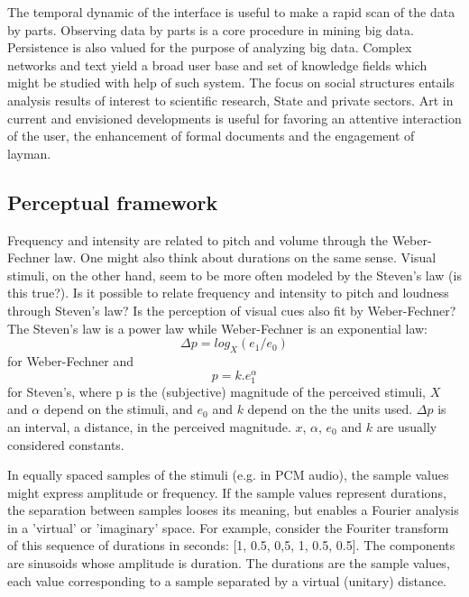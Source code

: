 \documentclass[letterpaper,10pt]{article}
\begin{document}
The temporal dynamic of the interface is useful to make a rapid scan of the data by parts.
Observing data by parts is a core procedure in mining big data.
Persistence is also valued for the purpose of analyzing big data.
Complex networks and text yield a broad user base
and set of knowledge fields which might be studied with help of such system.
The focus on social structures entails analysis results of interest
to scientific research, State and private sectors.
Art in current and envisioned developments
is useful for favoring an attentive interaction of the user,
the enhancement of formal documents and the engagement
of layman.

\subsection{Perceptual framework}\label{perceptual}
Frequency and intensity are related to pitch and volume
through the Weber-Fechner law.
One might also think about durations on the same sense.
Visual stimuli, on the other hand, seem to be 
more often modeled by the Steven's law (is this true?).
Is it possible to relate frequency and intensity to
pitch and loudness through Steven's law?
Is the perception of visual cues also fit by Weber-Fechner?
The Steven's law is a power law while Weber-Fechner is an exponential
law:
\begin{equation}
	\Delta p = log_X(e_1/e_0)
\end{equation}
\noindent for Weber-Fechner and
\begin{equation}
	p = k.e_1^\alpha
\end{equation}
\noindent for Steven's,
where p is the (subjective) magnitude of the perceived stimuli,
$X$ and $\alpha$ depend on the stimuli,
and $e_0$ and $k$ depend on the the units used.
$\Delta p$ is an interval, a distance, in the perceived magnitude.
$x$, $\alpha$, $e_0$ and $k$ are usually considered constants.

In equally spaced samples of the stimuli (e.g. in PCM audio),
the sample values might express amplitude or frequency.
If the sample values represent durations, the separation
between samples looses its meaning, but enables a Fourier
analysis in a 'virtual' or 'imaginary' space.
For example, consider the Fouriter transform of
this sequence of durations in seconds:
[1, 0.5, 0,5, 1, 0.5, 0.5].
The components are sinusoids whose amplitude
is duration.
The durations are the sample values,
each value corresponding to a sample separated
by a virtual (unitary) distance.
\end{document}
